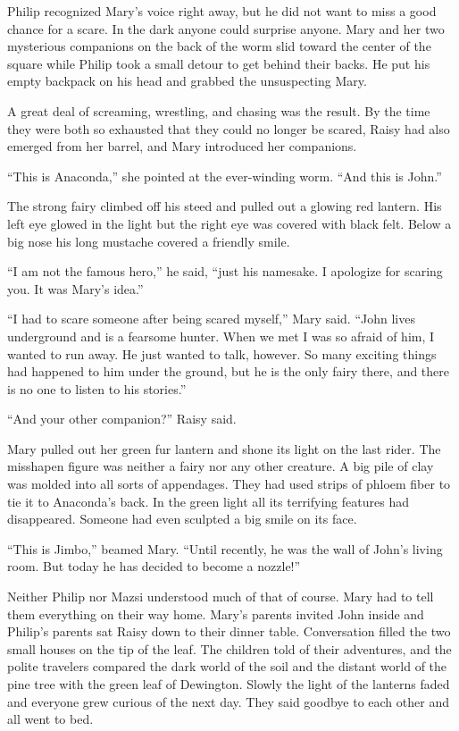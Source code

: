 \documentclass[10pt, draft]{memoir}
\begin{document}
Philip recognized Mary's voice right away, but he did not want to miss a good chance for a scare. In the dark anyone could surprise anyone. Mary and her two mysterious companions on the back of the worm slid toward the center of the square while Philip took a small detour to get behind their backs. He put his empty backpack on his head and grabbed the unsuspecting Mary.

A great deal of screaming, wrestling, and chasing was the result. By the time they were both so exhausted that they could no longer be scared, Raisy had also emerged from her barrel, and Mary introduced her companions.

``This is Anaconda,'' she pointed at the ever-winding worm. ``And this is John.''

The strong fairy climbed off his steed and pulled out a glowing red lantern. His left eye glowed in the light but the right eye was covered with black felt. Below a big nose his long mustache covered a friendly smile.

``I am not the famous hero,'' he said, ``just his namesake. I apologize for scaring you. It was Mary's idea.''

``I had to scare someone after being scared myself,'' Mary said. ``John lives underground and is a fearsome hunter. When we met I was so afraid of him, I wanted to run away. He just wanted to talk, however. So many exciting things had happened to him under the ground, but he is the only fairy there, and there is no one to listen to his stories.''

``And your other companion?'' Raisy said.

Mary pulled out her green fur lantern and shone its light on the last rider. The misshapen figure was neither a fairy nor any other creature. A big pile of clay was molded into all sorts of appendages. They had used strips of phloem fiber to tie it to Anaconda's back. In the green light all its terrifying features had disappeared. Someone had even sculpted a big smile on its face.

``This is Jimbo,'' beamed Mary. ``Until recently, he was the wall of John's living room. But today he has decided to become a nozzle!''

Neither Philip nor Mazsi understood much of that of course. Mary had to tell them everything on their way home. Mary's parents invited John inside and Philip's parents sat Raisy down to their dinner table. Conversation filled the two small houses on the tip of the leaf. The children told of their adventures, and the polite travelers compared the dark world of the soil and the distant world of the pine tree with the green leaf of Dewington. Slowly the light of the lanterns faded and everyone grew curious of the next day. They said goodbye to each other and all went to bed.
\end{document}

